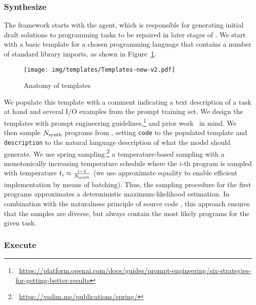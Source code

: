 \subsubsection{Synthesize}
\label{sec:seidr-synth}

The framework starts with the \synthesize{} agent, which is responsible for generating initial draft solutions to programming tasks to be repaired in later stages of \method{}.
We start with a basic template for a chosen programming language that contains a number of standard library imports, as shown in Figure~\ref{fig:template}.

\begin{figure}[t]
    \centering
    \texttt{[image: img/templates/Templates-new-v2.pdf]}
    \caption{Anatomy of \synthesize{} templates}
    \label{fig:template}
\end{figure}

We populate this template with a comment indicating a text description of a task at hand and several I/O examples from the prompt training set.
We design the templates with prompt engineering guidelines,\footnote{~\url{https://platform.openai.com/docs/guides/prompt-engineering/six-strategies-for-getting-better-results}} and prior work~\cite{debruin2021:autoencoders} in mind.
We then sample $N_\text{synth}{}$ programs from \synthmodelnoargs{}, setting \texttt{code} to the populated template and \texttt{description} to the natural language description of what the model should generate.
We use spring sampling:\footnote{~\url{https://vadim.me/publications/spring/}} a temperature-based sampling with a monotonically increasing temperature schedule where the $i$-th program is sampled with temperature $t_i \approx \frac{i-1}{N_\text{synth}{}}$ (we use approximate equality to enable efficient implementation by means of batching).
Thus, the sampling procedure for the first programs approximates a deterministic maximum-likelihood estimation.
In combination with the naturalness principle of source code \cite{allamanis2018:survey,jiang2022:bugs}, this approach ensures that the samples are diverse, but always contain the most likely programs for the given task.

\subsubsection{Execute}
\label{sec:seidr-execute}

